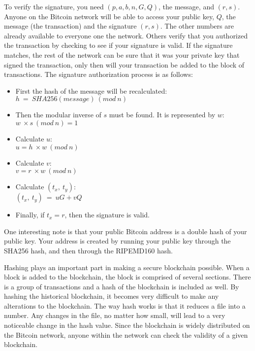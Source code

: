 \documentclass{article}
\begin{document}
	To verify the signature, you need \((p, a, b, n, G, Q)\), the message, and \((r, s)\). Anyone on the Bitcoin network will be able to access your public key, \(Q\), the message (the transaction) and the signature \((r, s)\). The other numbers are already available to everyone one the network. Others verify that you authorized the transaction by checking to see if your signature is valid. If the signature matches, the rest of the network can be sure that it was your private key that signed the transaction, only then will your transaction be added to the block of transactions. The signature authorization process is as follows:
\begin{itemize}
\item First the hash of the message will be recalculated:\\
	\(h\ =\ SHA256(message)\ (mod\ n)\)
\item Then the modular inverse of \(s\) must be found. It is represented by \(w\):\\
	\(w\ \times s\ (mod\ n)=1\)
\item Calculate \(u\): \\
	\(u=h\ \times w\ (mod\ n)\)
\item Calculate \(v\):\\
	\(v=r\ \times w\ (mod\ n)\)
\item Calculate \((t_x,\ t_y)\):\\
	\((t_x,\ t_y)\ =\ uG+vQ\)
\item Finally, if \(t_x=r\), then the signature is valid.
\end{itemize} 

	One interesting note is that your public Bitcoin address is a double hash of your public key. Your address is created by running your public key through the SHA256 hash, and then through the RIPEMD160 hash.
	 
	Hashing plays an important part in making a secure blockchain possible. When a block is added to the blockchain, the block is comprised of several sections. There is a group of transactions and a hash of the blockchain is included as well. By hashing the historical blockchain, it becomes very difficult to make any alterations to the blockchain. The way hash works is that it reduces a file into a number. Any changes in the file, no matter how small, will lead to a very noticeable change in the hash value. Since the blockchain is widely distributed on the Bitcoin network, anyone within the network can check the validity of a given blockchain.
	
\end{document}
